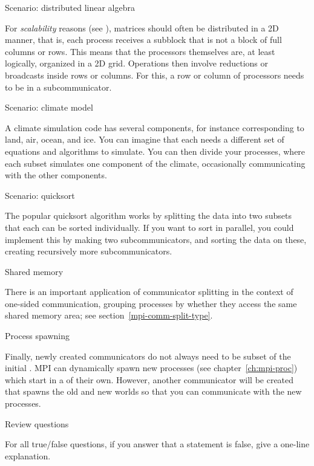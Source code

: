  {Scenario: distributed linear algebra}

For \emph{scalability} reasons
(see ),
matrices should often be distributed
in a 2D manner, that is, each process receives a subblock that is not
a block of full columns or rows. This means that the processors themselves
are, at least logically, organized in a 2D grid. Operations
then involve reductions or broadcasts inside rows or columns. For
this, a row or column of processors needs to be in a subcommunicator.

 {Scenario: climate model}

A climate simulation code has several components, for instance corresponding
to land, air, ocean, and ice. You can imagine that each needs a different set
of equations and algorithms to simulate. You can then divide your processes,
where each subset simulates one component of the climate, occasionally communicating
with the other components.

 {Scenario: quicksort}

The popular quicksort algorithm works by splitting the data
into two subsets that each can be sorted individually.
If you want to sort in parallel, you could implement this by making two subcommunicators,
and sorting the data on these, creating recursively more subcommunicators.

 {Shared memory}

There is an important application of communicator splitting in the
context of one-sided communication, grouping processes by whether they
access the same shared memory area; see section~\ref{mpi-comm-split-type}.

 {Process spawning}

Finally, newly created communicators do not always need to be subset
of the initial .
MPI can dynamically spawn new processes (see chapter~\ref{ch:mpi-proc})
which start in a  of their own.
However, another communicator will be created that spawns the old and new worlds
so that you can communicate with the new processes.







\newpage
{} {Review questions}

For all true/false questions, if you answer that a statement is false,
give a one-line explanation.

